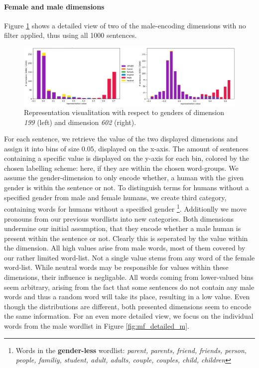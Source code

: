 \paragraph*{Female and male dimensions}
Figure \ref{fig:mf_basic} shows a detailed view of two of the male-encoding dimensions with no filter applied, thus using all 1000 sentences. 
\begin{figure}[tph!]
\centering
	\includegraphics[totalheight=4.5cm]{fig/mf_basic.png}
	\caption{Representation visualitation with respect to genders of dimension \textit{199} (left) and dimension \textit{602} (right).}
	\label{fig:mf_basic}
\end{figure}
For each sentence, we retrieve the value of the two displayed dimensions and assign it into bins of size $0.05$, displayed on the x-axis. The amount of sentences containing a specific value is displayed on the y-axis for each bin, colored by the chosen labelling scheme: here, if they are within the chosen word-groups. We assume the gender-dimension to only encode whether, a human with the given gender is within the sentence or not. To distinguish terms for humans without a specified gender from male and female humans, we create  third category, containing words for humans without a specified gender \footnote{Words in the \textbf{gender-less} wordlist: \textit{parent, parents, friend, friends, person, people, familiy, student, adult, adults, couple, couples, child, children}}. Additionlly we move pronouns from our previous wordlists into new categories. 
Both dimensions undermine our initial assumption, that they encode whether a male human is present within the sentence or not. Clearly this is seperated by the value within the dimension. All high values arise from male words, most of them covered by our rather limited word-list. Not a single value stems from any word of the female word-list. While neutral words may be responsible for values within these dimensions, their influence is negligable. All words coming from lower-valued bins seem arbitrary, arising from the fact that some sentences do not contain any male words and thus a random word will take its place, resulting in a low value. Even though the distributions are different, both presented dimensions seem to encode the same information. For an even more detailed view, we focus on the individual words from the male wordlist in Figure \ref{fig:mf_detailed_m}.
